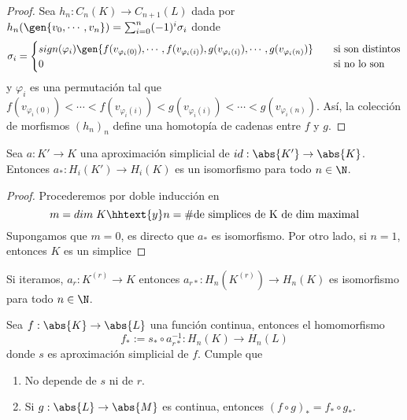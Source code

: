 \documentclass{article}
\begin{document}
\begin{proof}
    Sea $h_{n}:C_{n}(K)\to C_{n+1}(L)$ dada por $h_{n}(\gen{v_{0},\cdots,v_{n}})
    =\sum_{i=0}^{n}(-1)^{i}\sigma_{i}$ donde
    \begin{equation*}
        \sigma_{i}=\begin{cases}
            sign(\varphi_{i})\gen{f(v_{\varphi_{i}(0)}),\cdots,
            f(v_{\varphi_{i}(i)}),g(v_{\varphi_{i}(i)}),\cdots,g(v_{\varphi_{i}(n)})} 
            &\quad\text{si son distintos} \\
            0 &\quad\text{si no lo son}
        \end{cases}
    \end{equation*}
    y $\varphi_{i}$ es una permutación tal que $f(v_{\varphi_{i}(0)})<\cdots<f(v_{\varphi_{i}(i)})
    <g(v_{\varphi_{i}(i)})<\cdots<g(v_{\varphi_{i}(n)})$. Así, la colección de morfismos 
    $(h_{n})_{n}$ define una homotopía de cadenas entre $f$ y $g$.
\end{proof}

\vspace{2mm}
\begin{lema}
    Sea $a:K'\to K$ una aproximación simplicial de $id:\abs{K'}\to\abs{K}$. Entonces 
    $a_{*}:H_{i}(K')\to H_{i}(K)$ es un isomorfismo para todo $n\in\N$.
\end{lema}

\begin{proof}
    Procederemos por doble inducción en
    \begin{equation*}
        m=dim\hspace{1mm}K
        \hhtext{y}
        n=\#\text{de simplices de K de dim maximal}
    \end{equation*}
    Supongamos que $m=0$, es directo que $a_{*}$ es isomorfismo. Por otro lado, si $n=1$, entonces
    $K$ es un simplice
\end{proof}

\noindent Si iteramos, $a_{r}:K^{(r)}\to K$ entonces $a_{r*}:H_{n}(K^{(r)})\to H_{n}(K)$ es 
isomorfismo para todo $n\in\N$.

\begin{teo}
    Sea $f:\abs{K}\to\abs{L}$ una función continua, entonces el homomorfismo
    \begin{equation*}
        f_{*}:=s_{*}\circ a_{r*}^{-1}:H_{n}(K)\to H_{n}(L)
    \end{equation*}
    donde $s$ es aproximación simplicial de $f$. Cumple que
    \begin{enumerate}
        \item No depende de $s$ ni de $r$.
        \item Si $g:\abs{L}\to\abs{M}$ es continua, entonces $(f\circ g)_{*}=f_{*}\circ g_{*}$.
    \end{enumerate}
\end{teo}
\end{document}

